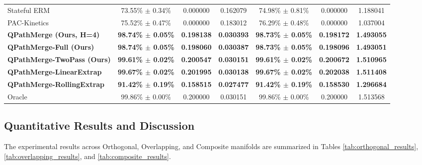 \begin{table}[t]
\begin{center}
\begin{small}
\begin{sc}
\begin{tabular}{lcccccc}
Stateful ERM      & 73.55\% $\pm$ 0.34\% & 0.000000 & 0.162079 & 74.98\% $\pm$ 0.81\% & 0.000000 & 1.188041 \\
PAC-Kinetics      & 75.52\% $\pm$ 0.47\% & 0.000000 & 0.183012 & 76.29\% $\pm$ 0.48\% & 0.000000 & 1.037004 \\
\textbf{QPathMerge (Ours, H=4)} & \textbf{98.74\% $\pm$ 0.05\%} & \textbf{0.198138} & \textbf{0.030393} & \textbf{98.73\% $\pm$ 0.05\%} & \textbf{0.198172} & \textbf{1.493055} \\
\textbf{QPathMerge-Full (Ours)} & \textbf{98.74\% $\pm$ 0.05\%} & \textbf{0.198060} & \textbf{0.030387} & \textbf{98.73\% $\pm$ 0.05\%} & \textbf{0.198096} & \textbf{1.493051} \\
\textbf{QPathMerge-TwoPass (Ours)} & \textbf{99.61\% $\pm$ 0.02\%} & \textbf{0.200547} & \textbf{0.030151} & \textbf{99.61\% $\pm$ 0.02\%} & \textbf{0.200672} & \textbf{1.510965} \\
\textbf{QPathMerge-LinearExtrap} & \textbf{99.67\% $\pm$ 0.02\%} & \textbf{0.201995} & \textbf{0.030138} & \textbf{99.67\% $\pm$ 0.02\%} & \textbf{0.202038} & \textbf{1.511408} \\
\textbf{QPathMerge-RollingExtrap} & \textbf{91.42\% $\pm$ 0.19\%} & \textbf{0.158515} & \textbf{0.027477} & \textbf{91.42\% $\pm$ 0.19\%} & \textbf{0.158530} & \textbf{1.296684} \\
\midrule
Oracle            & 99.86\% $\pm$ 0.00\% & 0.200000 & 0.030151 & 99.86\% $\pm$ 0.00\% & 0.200000 & 1.513568 \\
\bottomrule
\end{tabular}
\end{sc}
\end{small}
\end{center}
\vskip -0.1in
\end{table}

\subsection{Quantitative Results and Discussion}
The experimental results across Orthogonal, Overlapping, and Composite manifolds are summarized in Tables \ref{tab:orthogonal_results}, \ref{tab:overlapping_results}, and \ref{tab:composite_results}.

